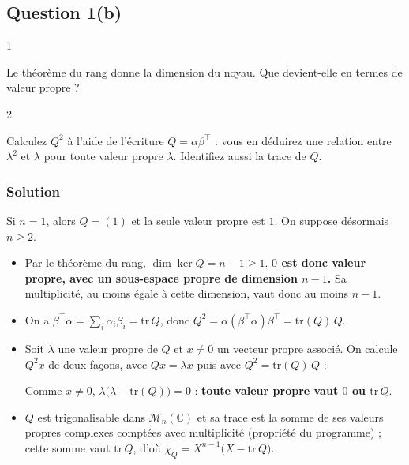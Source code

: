 \documentclass[11pt,a4paper]{article}
\newcommand{\equationajustee}[1]{%
  \sbox{\boiteequation}{$\displaystyle #1$}%
  \ifdim\wd\boiteequation>\linewidth
    \[\resizebox{\linewidth}{!}{\usebox{\boiteequation}}\]%
  \else
    \[#1\]%
  \fi}
\begin{document}
\hypertarget{question-1b-2}{%
\subsection{Question 1(b)}\label{question-1b-2}}

\begin{indication}{1}

Le théorème du rang donne la dimension du noyau. Que devient-elle en termes de valeur propre ?

\end{indication}

\begin{indication}{2}

Calculez \(Q^2\) à l'aide de l'écriture \(Q=\alpha\beta^\top\) : vous en déduirez une relation entre \(\lambda^2\) et \(\lambda\) pour toute valeur propre \(\lambda\). Identifiez aussi la trace de \(Q\).

\end{indication}

\hypertarget{solution-37}{%
\subsubsection{Solution}\label{solution-37}}

Si \(n=1\), alors \(Q=(1)\) et la seule valeur propre est \(1\). On suppose désormais \(n\ge2\).

\begin{itemize}
\item
  Par le théorème du rang, \(\dim\ker Q=n-1\ge1\). \textbf{\(0\) est donc valeur propre, avec un sous-espace propre de dimension \(n-1\).} Sa multiplicité, au moins égale à cette dimension, vaut donc au moins \(n-1\).
\item
  On a \(\beta^\top\alpha=\sum_i\alpha_i\beta_i=\mathrm{tr}\,Q\), donc \(Q^2=\alpha(\beta^\top\alpha)\beta^\top=\mathrm{tr}(Q)\,Q\).
\item
  Soit \(\lambda\) une valeur propre de \(Q\) et \(x\neq0\) un vecteur propre associé. On calcule \(Q^2x\) de deux façons, avec \(Qx=\lambda x\) puis avec \(Q^2=\mathrm{tr}(Q)\,Q\) :

  \equationajustee{\lambda^2x=\mathrm{tr}(Q)\,\lambda x.}

  Comme \(x\neq0\), \(\lambda\big(\lambda-\mathrm{tr}(Q)\big)=0\) : \textbf{toute valeur propre vaut \(0\) ou \(\mathrm{tr}\,Q\)}.
\item
  \(Q\) est trigonalisable dans \({\mathcal{M}}_n(\mathbb{C})\) et sa trace est la somme de ses valeurs propres complexes comptées avec multiplicité (propriété du programme) ; cette somme vaut \(\mathrm{tr}\,Q\), d'où \(\chi_Q=X^{n-1}\big(X-\mathrm{tr}\,Q\big)\).
\end{itemize}
\end{document}
